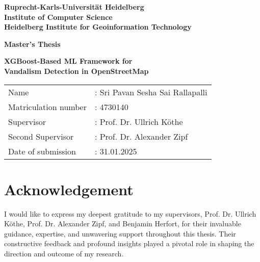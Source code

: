 \documentclass[
    13pt, %
    a4paper, %
    DIV14, %
    listof=totoc, %
    bibliography=totoc, %
    index=totoc, %
    headsepline
]{scrreprt}
\begin{document}
\begin{titlepage}

\begin{center}

\vspace*{2cm} %
\textbf{
\LARGE Ruprecht-Karls-Universität Heidelberg\\
\vspace*{0.5cm}
\smallskip
\Large Institute of Computer Science\\
\smallskip
\Large Heidelberg Institute for Geoinformation Technology\\
}

\vspace{2cm} %
\textbf{\large Master's Thesis} %

\textbf{\LARGE
XGBoost-Based ML Framework for \\
\vspace{0.3cm}
Vandalism Detection in OpenStreetMap
}

\vspace{2cm} %
{\large
\begin{tabular}{ll}
Name &:     Sri Pavan Sesha Sai Rallapalli\\
Matriculation number&: 4730140\\
Supervisor&:  Prof. Dr. Ullrich Köthe\\
Second Supervisor&: Prof. Dr. Alexander Zipf\\
Date of submission&:  31.01.2025
\end{tabular}
}

\end{center}

\end{titlepage}




\newpage
\thispagestyle{empty}
\null

\newpage
\section*{\LARGE Acknowledgement}

I would like to express my deepest gratitude to my supervisors, Prof. Dr. Ullrich Köthe, Prof. Dr. Alexander Zipf, and Benjamin Herfort, for their invaluable guidance, expertise, and unwavering support throughout this thesis. Their constructive feedback and profound insights played a pivotal role in shaping the direction and outcome of my research.
\end{document}
